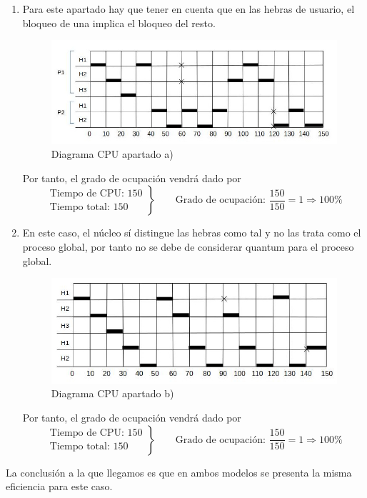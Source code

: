 \documentclass[a4paper, 12pt]{article}
\begin{document}
\begin{enumerate}[label=\alph*)]
	\item Para este apartado hay que tener en cuenta que en las hebras de usuario, el bloqueo de una implica el bloqueo del resto.
	
	\begin{figure}[h]
		\centering
		\includegraphics[scale=0.7]{images/apartadoA.jpg}
		\caption{Diagrama CPU apartado a)}
	\end{figure}
	
	Por tanto, el grado de ocupación vendrá dado por
	\[
	\left.
	\begin{array}{l}
	\text{Tiempo de CPU: } 150 \\
	\text{Tiempo total: } 150
	\end{array}
	\right\} \qquad \text{Grado de ocupación: } \frac{150}{150} = 1 \Rightarrow 100\%
	\]
	
	\bigskip
	
	\item En este caso, el núcleo sí distingue las hebras como tal y no las trata como el proceso global, por tanto no se debe de considerar quantum para el proceso global.
	
	\begin{figure}[h]
	\centering
	\includegraphics[scale=0.7]{images/apartadoB.jpg}
	\caption{Diagrama CPU apartado b)}
	\end{figure}
	
	Por tanto, el grado de ocupación vendrá dado por
	\[
	\left.
	\begin{array}{l}
	\text{Tiempo de CPU: } 150 \\
	\text{Tiempo total: } 150
	\end{array} 
	\right\} \qquad \text{Grado de ocupación: } \frac{150}{150} = 1 \Rightarrow 100\%
	\]
\end{enumerate}

La conclusión a la que llegamos es que en ambos modelos se presenta la misma eficiencia para este caso.
\end{document}
